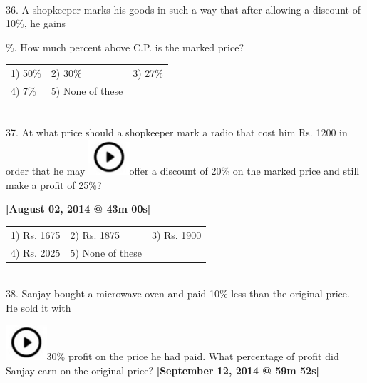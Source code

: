 \documentclass{article}
\begin{document}
	\noindent 
	
	\noindent 
	
	\noindent \\  36. A shopkeeper marks his goods in such a way that after allowing a discount of 10\%, he gains
	
	\noindent 
	
	\%. How much percent above C.P. is the marked price?
	
	\noindent 
	
	\noindent \begin{tabular}{p{1.7in} p{1.6in} p{1.6in}} \\ 
 1) 50\%                    & 2) 30\%              & 3) 27\%              \\
4) 7\%                & 5) None of these \\
\end{tabular}
	
	\noindent  \\ 
	
	37. At what price should a shopkeeper mark a radio that cost him Rs. 1200 in order that he may \includegraphics*[width=0.60in, height=0.52in]{images/image1}offer a discount of 20\% on the marked price and still make a profit of 25\%?
	
	\noindent \textbf{[August 02, 2014 @ 43m 00s]}
	
	\noindent 
	
	\noindent \begin{tabular}{p{1.7in} p{1.6in} p{1.6in}} \\ 
 1) Rs. 1675                 & 2) Rs. 1875          & 3) Rs. 1900          \\
4) Rs. 2025          & 5) None of these \\
\end{tabular}
	
	\noindent 
	
	\noindent 
	
	\noindent 
	
	\noindent  \\ 38. Sanjay bought a microwave oven and paid 10\% less than the original price. He sold it with
	
	\noindent 
	
	\noindent \includegraphics*[width=0.60in, height=0.52in]{images/image1}30\% profit on the price he had paid. What percentage of profit did Sanjay earn on the original price?       \textbf{[September 12, 2014 @ 59m 52s]}
	
\end{document}
